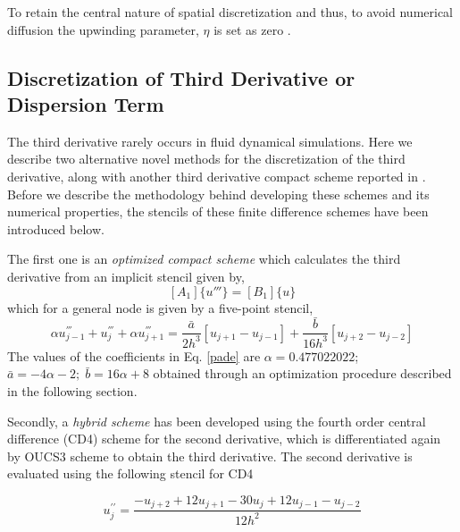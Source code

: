 \documentclass{svjour3}                    %
\begin{document}
 To retain the central nature of spatial discretization and thus, to avoid numerical diffusion the upwinding parameter, $\eta$ is set as zero \cite{Sengupta2013a,Sengupta2006b}.
\subsection{Discretization of Third Derivative or Dispersion Term}
The third derivative rarely occurs in fluid dynamical simulations. Here we describe two alternative novel methods for the discretization of the third derivative, along with another third derivative compact scheme reported in \cite{Li2006}. Before we describe the methodology behind developing these schemes and its numerical properties, the stencils of these finite difference schemes have been introduced below.

The first one is an \textit{optimized compact scheme} which calculates the third derivative from an implicit stencil given by,
\begin{equation*}
\label{matrix}
[A_1]\{u'''\} = [B_1]\{u\}
\end{equation*}
which for a general node is given by a five-point stencil,
\begin{equation}
\label{pade}
\alpha u_{j-1}^{'''} +  u_{j}^{'''} + \alpha u_{j+1}^{'''} 
= \frac{\bar{a}}{2h^3}\left[u_{j+1}-u_{j-1}\right] + \frac{\bar{b}}{16h^3}\left[u_{j+2}-u_{j-2}\right]
\end{equation}
The values of the coefficients in Eq. \eqref{pade} are $\alpha=0.477022022$; $ \bar{a}= -4\alpha-2;\; \bar{b}=16\alpha +8$ obtained through an optimization procedure described in the following section. 

Secondly, a \textit{hybrid scheme} has been developed using the fourth order central difference (CD4) scheme for the second derivative, which is differentiated again by OUCS3 scheme to obtain the third derivative. The second derivative is evaluated using the following stencil for CD4

\begin{equation}
\label{eq:cd4}
u_{j}^{\prime\prime}=\frac{-u_{j+2}+12u_{j+1}-30u_{j}+12u_{j-1}-u_{j-2}}{12h^{2}}
\end{equation}
\end{document}
